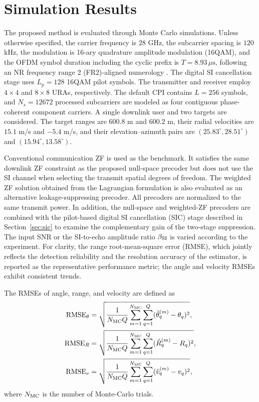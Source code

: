 \documentclass[conference]{IEEEtran}
\begin{document}
\section{Simulation Results}\label{sec:simulation}
The proposed method is evaluated through Monte Carlo simulations. Unless otherwise specified, the carrier frequency is $28$ GHz, the subcarrier spacing is $120$ kHz, the modulation is 16-ary quadrature amplitude modulation (16QAM), and the OFDM symbol duration including the cyclic prefix is $T=8.93\,\mu\mathrm{s}$, following an NR frequency range 2 (FR2)-aligned numerology \cite{3gpp38104}. The digital SI cancellation stage uses $L_p=128$ 16QAM pilot symbols. The transmitter and receiver employ $4\times4$ and $8\times8$ URAs, respectively. The default CPI contains $L=256$ symbols, and $N_s=12672$ processed subcarriers are modeled as four contiguous phase-coherent component carriers. A single downlink user and two targets are considered. The target ranges are $600.8$ m and $600.2$ m, their radial velocities are $15.1$ m/s and $-5.4$ m/s, and their elevation--azimuth pairs are $(25.83^\circ,28.51^\circ)$ and $(15.94^\circ,13.58^\circ)$.

Conventional communication ZF is used as the benchmark. It satisfies the same downlink ZF constraint as the proposed null-space precoder but does not use the SI channel when selecting the transmit spatial degrees of freedom. The weighted ZF solution obtained from the Lagrangian formulation is also evaluated as an alternative leakage-suppressing precoder. All precoders are normalized to the same transmit power. In addition, the null-space and weighted-ZF precoders are combined with the pilot-based digital SI cancellation (SIC) stage described in Section~\ref{sec:sic} to examine the complementary gain of the two-stage suppression. The input SNR or the SI-to-echo amplitude ratio $\beta_{\rm SI}$ is varied according to the experiment. For clarity, the range root-mean-square error (RMSE), which jointly reflects the detection reliability and the resolution accuracy of the estimator, is reported as the representative performance metric; the angle and velocity RMSEs exhibit consistent trends.

The RMSEs of angle, range, and velocity are defined as
\begin{align}
\mathrm{RMSE}_{\theta}&=\sqrt{\frac{1}{N_{\rm MC}Q}\sum_{m=1}^{N_{\rm MC}}\sum_{q=1}^{Q}(\hat\theta_q^{(m)}-\theta_q)^2},\\
\mathrm{RMSE}_{R}&=\sqrt{\frac{1}{N_{\rm MC}Q}\sum_{m=1}^{N_{\rm MC}}\sum_{q=1}^{Q}(\hat R_q^{(m)}-R_q)^2},\\
\mathrm{RMSE}_{v}&=\sqrt{\frac{1}{N_{\rm MC}Q}\sum_{m=1}^{N_{\rm MC}}\sum_{q=1}^{Q}(\hat v_q^{(m)}-v_q)^2},
\end{align}
where $N_{\rm MC}$ is the number of Monte-Carlo trials.
\end{document}
